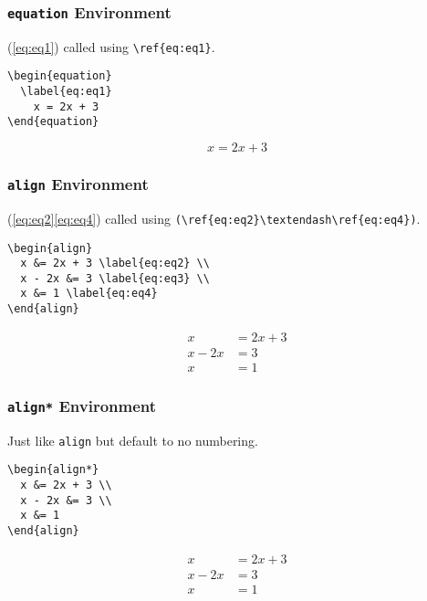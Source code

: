 \documentclass{beamer}
\begin{document}
\begin{frame}[fragile]
  \frametitle{\texttt{equation} Environment}

  (\ref{eq:eq1}) called using \verb|\ref{eq:eq1}|.

  \begin{verbatim}
\begin{equation}
  \label{eq:eq1}
    x = 2x + 3
\end{equation}
  \end{verbatim}

  \begin{equation}
    \label{eq:eq1}
      x = 2x + 3
  \end{equation}
\end{frame}

\begin{frame}[fragile]
  \frametitle{\texttt{align} Environment}

  (\ref{eq:eq2}\textendash\ref{eq:eq4}) called using \verb|(\ref{eq:eq2}\textendash\ref{eq:eq4})|.

  \begin{verbatim}
\begin{align}
  x &= 2x + 3 \label{eq:eq2} \\
  x - 2x &= 3 \label{eq:eq3} \\
  x &= 1 \label{eq:eq4}
\end{align}
    \end{verbatim}

  \begin{align}
    x &= 2x + 3 \label{eq:eq2} \\
    x - 2x &= 3 \label{eq:eq3} \\
    x &= 1 \label{eq:eq4}
  \end{align}
\end{frame}

\begin{frame}[fragile]
  \frametitle{\texttt{align*} Environment}

  Just like \texttt{align} but default to no numbering.
  \begin{verbatim}
\begin{align*}
  x &= 2x + 3 \\
  x - 2x &= 3 \\
  x &= 1
\end{align}
    \end{verbatim}

  \begin{align*}
    x &= 2x + 3 \\
    x - 2x &= 3 \\
    x &= 1
  \end{align*}
\end{frame}
\end{document}
